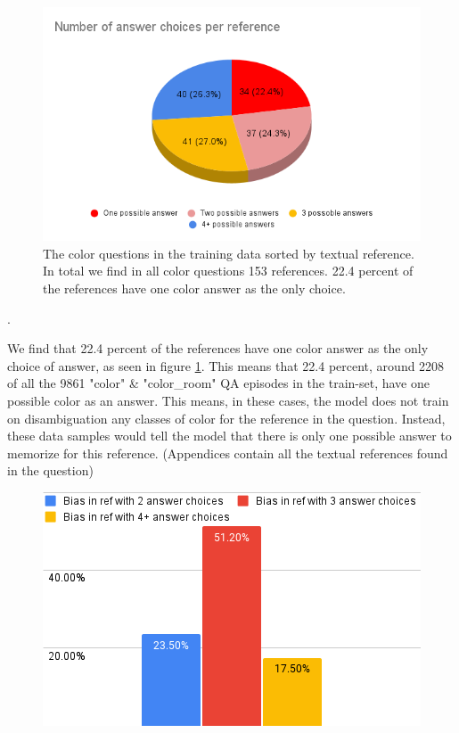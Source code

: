 \begin{figure}[H]
\centering
\includegraphics[scale=0.5]{images/AnsRef.png}
\caption{The color questions in the training data sorted by textual reference. In total we find in all color questions 153 references.
22.4 percent of the references have one color answer as the only choice.  }
\label{fig:AnsRef}
\end{figure}.

We find that 22.4 percent of the references have one color answer as the only choice of answer, as seen in figure \ref{fig:AnsRef}. This means that 22.4 percent, around 2208 of all the  9861 "color" \& "color\_room" QA episodes in the train-set, have one possible color as an answer. This means, in these cases, the model does not train on disambiguation any classes of color for the reference in the question.
Instead, these data samples would tell the model that there is only one possible answer to memorize for this reference. (Appendices contain all the textual references found in the question)

\begin{figure}[H]
\centering
\includegraphics[scale=0.5]{images/biasperRef.png}
\caption{}
\label{fig:biasRef}
\end{figure}

